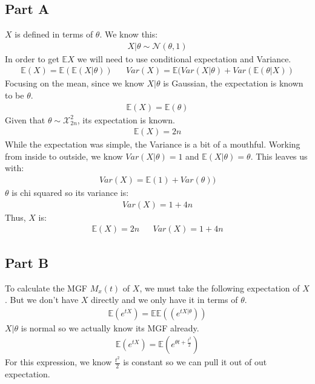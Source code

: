 \documentclass{article}
\begin{document}
\subsection*{Part A}
$X$ is defined in terms of $\theta$. We know this:
\begin{align*}
X|\theta \sim \mathcal{N}(\theta,1)
\end{align*}
In order to get $\mathbb{E}X$ we will need to use conditional expectation and Variance.
\begin{align*}
\mathbb{E}(X) = \mathbb{E}(\mathbb{E}(X|\theta)) && Var(X) = \mathbb{E}(Var(X|\theta)+Var(\mathbb{E}(\theta|X))
\end{align*}
Focusing on the mean, since we know $X|\theta$ is Gaussian, the expectation is known to be $\theta$.
\begin{align*}
\mathbb{E}(X) = \mathbb{E}(\theta)
\end{align*}
Given that $\theta \sim \mathcal{X}_{2n}^{2}$, its expectation is known.
\begin{align*}
\mathbb{E}(X) = 2n
\end{align*}
While the expectation was simple, the Variance is a bit of a mouthful. Working from inside to outside, we know $Var(X|\theta) = 1$ and $\mathbb{E}(X|\theta)= \theta$. This leaves us with:
\begin{align*}
Var(X) = \mathbb{E}(1)+Var(\theta))
\end{align*}
$\theta$ is chi squared so its variance is:
\begin{align*}
Var(X) = 1+4n
\end{align*}
Thus, $X$ is:
\begin{align*}
\boxed{\mathbb{E}(X) = 2n} && \boxed{ Var(X) = 1+4n }
\end{align*}
\subsection*{Part B}
To calculate the MGF $M_x(t)$ of $X$, we must take the following expectation of $X$. But we don't have $X$ directly and we only have it in terms of $\theta$.
\begin{align*}
\mathbb{E}(e^{tX}) = \mathbb{E}\mathbb{E}((e^{tX|\theta}))
\end{align*}
$X|\theta$ is normal so we actually know its MGF already. 
\begin{align*}
\mathbb{E}(e^{tX}) = \mathbb{E}(e^{\theta t + \tfrac{t^2}{2}})
\end{align*}
For this expression, we know $\tfrac{t^2}{2}$ is constant so we can pull it out of out expectation.
\end{document}

